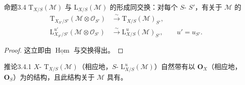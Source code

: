 \begin{SGAresult}{命题}{3.4}
$\mathrm T_{X/S}(\mathcal M)$ 与 $\mathrm L_{X/S}(\mathcal M)$ 的形成同交换：对每个 $S$- $S'$，有关于 $\mathcal M$ 的
\[
\begin{aligned}
\mathrm T_{X_{S'}/S'}(\mathcal M\otimes\mathcal O_{S'})&\xrightarrow\sim\mathrm T_{X/S}(\mathcal M)_{S'},\\
\mathrm L^{u'}_{X_{S'}/S'}(\mathcal M\otimes\mathcal O_{S'})&\xrightarrow\sim\mathrm L^u_{X/S}(\mathcal M)_{S'},\qquad u'=u_{S'}.
\end{aligned}
\]
\end{SGAresult}
\begin{proof}
这立即由 $\underline{\operatorname{Hom}}$ 与交换得出。
\end{proof}
\begin{SGAresult}{推论}{3.4.1}
$X$- $\mathrm T_{X/S}(\mathcal M)$（相应地，$S$- $\mathrm L^u_{X/S}(\mathcal M)$）自然带有以 $\mathbf O_X$（相应地，$\mathbf O_S$）为的结构，且此结构关于 $\mathcal M$ 具有。
\end{SGAresult}
